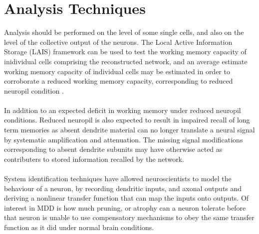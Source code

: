 \documentclass[a4paper,11pt]{article}
\begin{document}

\section{Analysis Techniques}
Analysis should be performed on the level of some single cells, and also on the level of the collective output of the neurons. The Local Active Information Storage (LAIS) framework can be used to test the working memory capacity of inidividual cells comprising the reconstructed network, and an average estimate working memory capacity of individual cells may be estimated in order to corroborate a reduced working memory capacity, corresponding to reduced neuropil condition \cite{lizier2012local}.\\ %
\\
In addition to an expected deficit in working memory under reduced neuropil conditions. Reduced neuropil is also expected to result in impaired recall of long term memories as absent dendrite material can no longer translate a neural signal by systematic amplification and attenuation. The missing signal modifications corresponding to absent dendrite subunits may have otherwise acted as contributers to stored information recalled by the network.\\ 
\\
System identification techniques have allowed neuroscientists to model the behaviour of a neuron, by recording dendritic inputs, and axonal outputs and deriving a nonlinear transfer function that can map the inputs onto outputs\cite{caze2013passive}. Of interest in MDD is how much pruning, or atrophy can a neuron tolerate before that neuron is unable to use compensatory mechanisms to obey the same transfer function as it did under normal brain conditions.\\
\\

\end{document}
